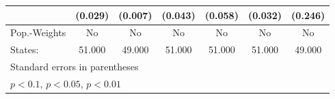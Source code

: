{\begin{tabular}{l*{6}{c}}
            &     (0.029)         &     (0.007)         &     (0.043)         &     (0.058)         &     (0.032)         &     (0.246)         \\
\hline
Pop.-Weights&          No         &          No         &          No         &          No         &          No         &          No         \\
States:     &      51.000         &      49.000         &      51.000         &      51.000         &      51.000         &      49.000         \\
\hline\hline
\multicolumn{7}{l}{\footnotesize Standard errors in parentheses}\\
\multicolumn{7}{l}{\footnotesize \sym{*} \(p<0.1\), \sym{**} \(p<0.05\), \sym{***} \(p<0.01\)}\\
\end{tabular}
}

